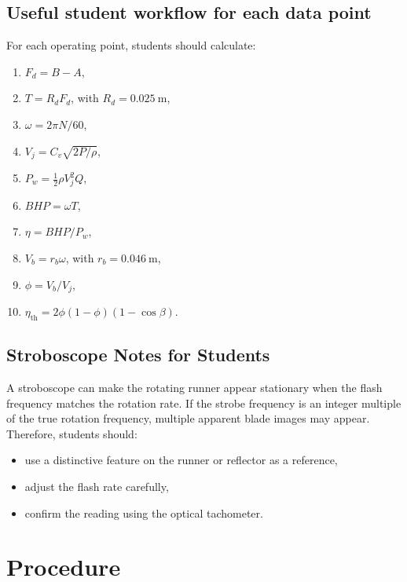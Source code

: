 \documentclass[12pt,letterpaper]{article}
\begin{document}
\subsection{Useful student workflow for each data point}
For each operating point, students should calculate:
\begin{enumerate}[leftmargin=*, label=\arabic*.]
    \item \(F_d = B-A\),
    \item \(T = R_dF_d\), with \(R_d=0.025~\text{m}\),
    \item \(\omega = 2\pi N/60\),
    \item \(V_j = C_v\sqrt{2P/\rho}\),
    \item \(P_w = \frac{1}{2}\rho V_j^2Q\),
    \item \(BHP = \omega T\),
    \item \(\eta = BHP/P_w\),
    \item \(V_b = r_b\omega\), with \(r_b=0.046~\text{m}\),
    \item \(\phi = V_b/V_j\),
    \item \(\eta_{\text{th}} = 2\phi(1-\phi)(1-\cos\beta)\).
\end{enumerate}

\subsection{Stroboscope Notes for Students}
A stroboscope can make the rotating runner appear stationary when the flash frequency matches the rotation rate. If the strobe frequency is an integer multiple of the true rotation frequency, multiple apparent blade images may appear. Therefore, students should:
\begin{itemize}[leftmargin=*]
    \item use a distinctive feature on the runner or reflector as a reference,
    \item adjust the flash rate carefully,
    \item confirm the reading using the optical tachometer.
\end{itemize}

\section{Procedure}
\end{document}
